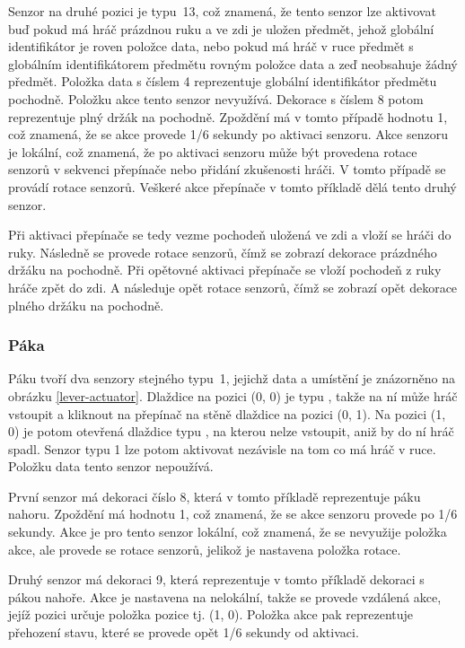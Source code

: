 Senzor na druhé pozici je typu~13, což znamená, že tento senzor lze aktivovat buď pokud má hráč prázdnou ruku a ve zdi je uložen předmět, jehož
globální identifikátor je roven položce data, nebo pokud má hráč v ruce předmět s globálním identifikátorem předmětu rovným položce data a zeď neobsahuje
žádný předmět. Položka data s číslem 4 reprezentuje globální identifikátor předmětu pochodně. Položku akce tento senzor nevyužívá. Dekorace s číslem
8 potom reprezentuje plný držák na pochodně. Zpoždění má v tomto případě hodnotu 1, což znamená, že se akce provede 1/6 sekundy po aktivaci senzoru.
Akce senzoru je lokální, což znamená, že po aktivaci senzoru může být provedena rotace senzorů v sekvenci přepínače nebo přidání zkušenosti hráči. 
V tomto případě se provádí rotace senzorů. Veškeré akce přepínače v tomto příkladě dělá tento druhý senzor.

Při aktivaci přepínače se tedy vezme pochodeň uložená ve zdi a vloží se hráči do ruky. Následně se provede rotace senzorů, čímž se zobrazí
dekorace prázdného držáku na pochodně. Při opětovné aktivaci přepínače se vloží pochodeň z ruky hráče zpět do zdi. A následuje opět rotace senzorů, čímž
se zobrazí opět dekorace plného držáku na pochodně.


\subsubsection{Páka}

Páku tvoří dva senzory stejného typu~1, jejichž data a umístění je znázorněno na obrázku \ref{lever-actuator}. 
Dlaždice na pozici (0, 0) je typu , takže na ní může hráč vstoupit a kliknout na přepínač na stěně dlaždice  na pozici (0, 1).
Na pozici (1, 0) je potom otevřená dlaždice typu , na kterou nelze vstoupit, aniž by do ní hráč spadl.  
Senzor typu 1 lze potom aktivovat nezávisle na tom co má hráč v ruce. Položku data tento senzor nepoužívá. 

První senzor má dekoraci číslo 8, která v tomto příkladě reprezentuje páku nahoru. Zpoždění má hodnotu 1, což znamená, že se akce senzoru provede
po 1/6 sekundy. Akce je pro tento senzor lokální, což znamená, že se nevyužije položka akce, ale provede se rotace senzorů, jelikož je nastavena 
položka rotace. 

Druhý senzor má dekoraci 9, která reprezentuje v tomto příkladě dekoraci s pákou nahoře. Akce je nastavena na nelokální, takže se provede vzdálená
akce, jejíž pozici určuje položka pozice tj. (1, 0). Položka akce pak reprezentuje přehození stavu, které se provede opět 1/6 sekundy od aktivaci. 

